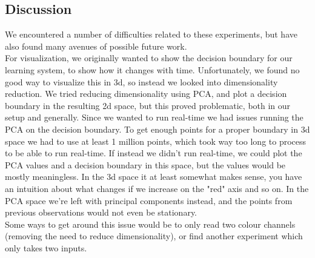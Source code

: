 \documentclass[11pt, a4paper]{article}
\begin{document}
\subsection{Discussion}
We encountered a number of difficulties related to these experiments, but have also found many avenues of possible future work. \\
For visualization, we originally wanted to show the decision boundary for our learning system, to show how it changes with time. Unfortunately, we found no good way to visualize this in 3d, so instead we looked into dimensionality reduction. We tried reducing dimensionality using PCA, and plot a decision boundary in the resulting 2d space, but this proved problematic, both in our setup and generally. Since we wanted to run real-time we had issues running the PCA on the decision boundary. To get enough points for a proper boundary in 3d space we had to use at least 1 million points, which took way too long to process to be able to run real-time. If instead we didn't run real-time, we could plot the PCA values and a decision boundary in this space, but the values would be mostly meaningless. In the 3d space it at least somewhat makes sense, you have an intuition about what changes if we increase on the "red" axis and so on. In the PCA space we're left with principal components instead, and the points from previous observations would not even be stationary. \\
Some ways to get around this issue would be to only read two colour channels (removing the need to reduce dimensionality), or find another experiment which only takes two inputs. \\
\end{document}
